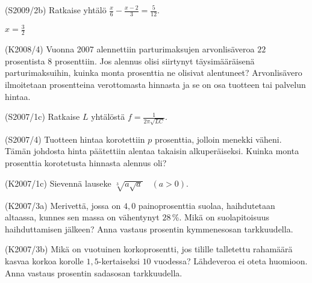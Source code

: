\begin{multicols}{2}
\begin{tehtava}(S2009/2b) Ratkaise yhtälö $\frac{x}{6} - \frac{x - 2}{3} = \frac{5}{12}$.
	\begin{vastaus}
				$x=\frac{3}{2}$
	\end{vastaus}
\end{tehtava}
\begin{tehtava}(K2008/4) Vuonna 2007 alennettiin parturimaksujen arvonlisäveroa $22$ prosentista $8$ prosenttiin. Jos alennus olisi siirtynyt täysimääräisenä parturimaksuihin, kuinka monta prosenttia ne olisivat alentuneet? Arvonlisävero ilmoitetaan prosentteina verottomasta hinnasta ja se on osa tuotteen tai palvelun hintaa.
\end{tehtava}

\begin{tehtava}(S2007/1c) Ratkaise $L$ yhtälöstä $f=\frac{1}{2\pi\sqrt{LC}}$.
\end{tehtava}

\begin{tehtava}(S2007/4) Tuotteen hintaa korotettiin $p$ prosenttia, jolloin menekki väheni. Tämän johdosta hinta päätettiin alentaa takaisin alkuperäiseksi. Kuinka monta prosenttia korotetusta hinnasta alennus oli?
\end{tehtava}

\begin{tehtava}(K2007/1c) Sievennä lauseke $ \sqrt[3]{a \sqrt{a}} \quad (a > 0) $.
\end{tehtava}

\begin{tehtava}(K2007/3a) Merivettä, jossa on $4,0$ painoprosenttia suolaa, haihdutetaan altaassa, kunnes sen massa on vähentynyt $28$\,\%. Mikä on suolapitoisuus haihduttamisen jälkeen? Anna vastaus prosentin kymmenesosan tarkkuudella. 
\end{tehtava}

\begin{tehtava}(K2007/3b) Mikä on vuotuinen korkoprosentti, jos tilille talletettu rahamäärä kasvaa korkoa korolle $1,5$-kertaiseksi $10$ vuodessa? Lähdeveroa ei oteta huomioon. Anna vastaus prosentin sadasosan tarkkuudella.
\end{tehtava}



\end{multicols}
